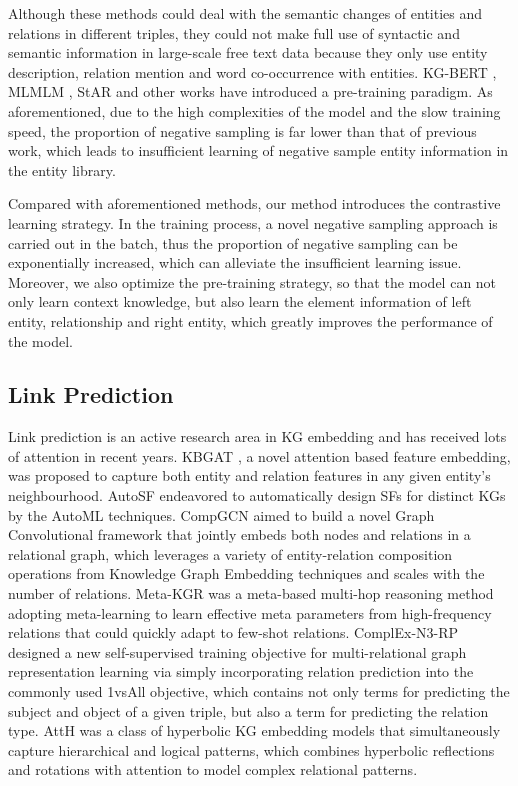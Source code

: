\documentclass[journal]{IEEEtran}
\begin{document}
Although these methods could deal with the semantic changes of entities and relations in different triples, they could not make full use of syntactic and semantic information in large-scale free text data because they only use entity description, relation mention and word co-occurrence with entities.
KG-BERT \cite{yao2019kg}, MLMLM \cite{clouatre2020mlmlm}, StAR \cite{wang2021structure} and other works have introduced a pre-training paradigm. As aforementioned, due to the high complexities of the model and the slow training speed, the proportion of negative sampling is far lower than that of previous work, which leads to insufficient learning of negative sample entity information in the entity library. 

Compared with aforementioned methods, our method introduces the contrastive learning strategy. In the training process, a novel negative sampling approach is carried out in the batch, thus the proportion of negative sampling can be exponentially increased, which can alleviate the insufficient learning issue. Moreover, we also optimize the pre-training strategy, so that the model can not only learn context knowledge, but also learn the element information of left entity, relationship and right entity, which greatly improves the performance of the model.

\subsection{Link Prediction}
Link prediction is an active research area in KG embedding and has received lots of attention in recent years. 
KBGAT \cite{nathani2019learning}, a novel attention based feature embedding, was proposed to capture both entity and relation features in any given entity's neighbourhood. 
AutoSF \cite{zhang2020autosf} endeavored to automatically design SFs for distinct KGs by the AutoML techniques. 
CompGCN \cite{vashishth2019composition} aimed to build a novel Graph Convolutional framework that jointly embeds both nodes and relations in a relational graph, which leverages a variety of entity-relation composition operations from Knowledge Graph Embedding techniques and scales with the number of relations. 
Meta-KGR \cite{lv2019adapting} was a meta-based multi-hop reasoning method adopting meta-learning to learn effective meta parameters from high-frequency relations that could quickly adapt to few-shot relations. 
ComplEx-N3-RP \cite{chen2021relation} designed a new self-supervised training objective for multi-relational graph representation learning via simply incorporating relation prediction into the commonly used 1vsAll objective, which contains not only terms for predicting the subject and object of a given triple, but also a term for predicting the relation type. 
AttH \cite{chami2020low} was a class of hyperbolic KG embedding models that simultaneously capture hierarchical and logical patterns, which combines hyperbolic reflections and rotations with attention to model complex relational patterns.
\end{document}
